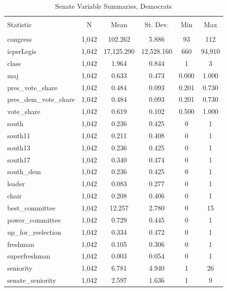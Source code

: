 \documentclass[12pt]{article}
\begin{document}
\begin{table}[H] \centering 
	\caption{Senate Variable Summaries, Democrats} 
	\label{} 
	\begin{tabular}{@{\extracolsep{5pt}}lccccc} 
		\\[-1.8ex]\hline 
		\hline \\[-1.8ex] 
		Statistic & \multicolumn{1}{c}{N} & \multicolumn{1}{c}{Mean} & \multicolumn{1}{c}{St. Dev.} & \multicolumn{1}{c}{Min} & \multicolumn{1}{c}{Max} \\ 
		\hline \\[-1.8ex] 
		congress & 1,042 & 102.262 & 5.886 & 93 & 112 \\ 
		icpsrLegis & 1,042 & 17,125.290 & 12,528.160 & 660 & 94,910 \\ 
		class & 1,042 & 1.964 & 0.844 & 1 & 3 \\ 
		maj & 1,042 & 0.633 & 0.473 & 0.000 & 1.000 \\ 
		pres\_vote\_share & 1,042 & 0.484 & 0.093 & 0.201 & 0.730 \\ 
		pres\_dem\_vote\_share & 1,042 & 0.484 & 0.093 & 0.201 & 0.730 \\ 
		vote\_share & 1,042 & 0.619 & 0.102 & 0.500 & 1.000 \\ 
		south & 1,042 & 0.236 & 0.425 & 0 & 1 \\ 
		south11 & 1,042 & 0.211 & 0.408 & 0 & 1 \\ 
		south13 & 1,042 & 0.236 & 0.425 & 0 & 1 \\ 
		south17 & 1,042 & 0.340 & 0.474 & 0 & 1 \\ 
		south\_dem & 1,042 & 0.236 & 0.425 & 0 & 1 \\ 
		leader & 1,042 & 0.083 & 0.277 & 0 & 1 \\ 
		chair & 1,042 & 0.208 & 0.406 & 0 & 1 \\ 
		best\_committee & 1,042 & 12.257 & 2.780 & 0 & 15 \\ 
		power\_committee & 1,042 & 0.729 & 0.445 & 0 & 1 \\ 
		up\_for\_reelection & 1,042 & 0.334 & 0.472 & 0 & 1 \\ 
		freshman & 1,042 & 0.105 & 0.306 & 0 & 1 \\ 
		superfreshman & 1,042 & 0.003 & 0.054 & 0 & 1 \\ 
		seniority & 1,042 & 6.781 & 4.940 & 1 & 26 \\ 
		senate\_seniority & 1,042 & 2.597 & 1.636 & 1 & 9 \\ 

\end{tabular}
\end{table}
\end{document}
